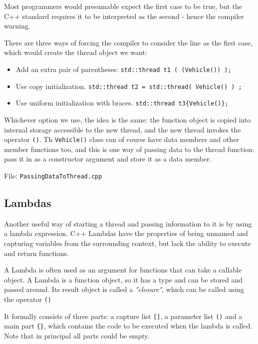 \documentclass[11pt, a4paper]{article}
\begin{document}
Most programmers would presumable expect the first case to be true, but the C++ standard requires it to be interpreted as the second - hence the compiler warning. 


There are three ways of forcing the compiler to consider the line as the first case, which would create the thread object we want:


\begin{itemize}
  \item Add an extra pair of parentheses: \texttt{std::thread t1 ( (Vehicle()) );} 
	\item Use copy initialization. \texttt{std::thread t2 = std::thread( Vehicle() ) ;} 
	\item Use uniform initialization with braces. \texttt{std::thread t3\{Vehicle()\};} 
\end{itemize}

Whichever option we use, the idea is the same: the function object is copied into internal storage accessible to the new thread, and the new thread invokes the operator \texttt{()}. Th \texttt{Vehicle()} class can of course have data members and other member functions too, and this is one way of passing data to the thread function: pass it in as a constructor argument and store it as a data member.

File: \texttt{PassingDataToThread.cpp} 




\subsection{Lambdas}%
\label{sub:lambdas}


Another useful way of starting a thread and passing information to it is by using a lambda expression. C++ Lambdas have the properties of being unnamed and capturing variables from the surrounding context, but lack the ability to execute and return functions. 

A Lambda is often used as an argument for functions that can take a callable object. A Lambda is a function object, so it has a type and can be stored and passed around. Its result object is called a \textit{"closure"}, which can be called using the operator \texttt{()} 

It formally consists of three parts: a capture list \texttt{[]}, a parameter list \texttt{()} and a main part \texttt{\{\}}, which contains the code to be executed when the lambda is called. Note that in principal all parts could be empty.
\end{document}

